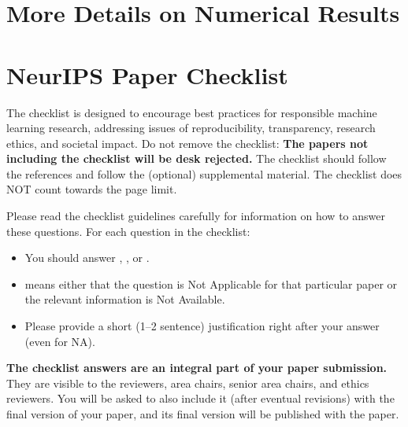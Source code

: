 \documentclass{article}
\begin{document}



\appendix

\section{More Details on Numerical Results}\label{apx:num}


\newpage
\section*{NeurIPS Paper Checklist}

The checklist is designed to encourage best practices for responsible machine learning research, addressing issues of reproducibility, transparency, research ethics, and societal impact. Do not remove the checklist: {\bf The papers not including the checklist will be desk rejected.} The checklist should follow the references and follow the (optional) supplemental material.  The checklist does NOT count towards the page
limit.

Please read the checklist guidelines carefully for information on how to answer these questions. For each question in the checklist:
\begin{itemize}
    \item You should answer \answerYes{}, \answerNo{}, or \answerNA{}.
    \item \answerNA{} means either that the question is Not Applicable for that particular paper or the relevant information is Not Available.
    \item Please provide a short (1–2 sentence) justification right after your answer (even for NA).
\end{itemize}

{\bf The checklist answers are an integral part of your paper submission.} They are visible to the reviewers, area chairs, senior area chairs, and ethics reviewers. You will be asked to also include it (after eventual revisions) with the final version of your paper, and its final version will be published with the paper.
\end{document}
